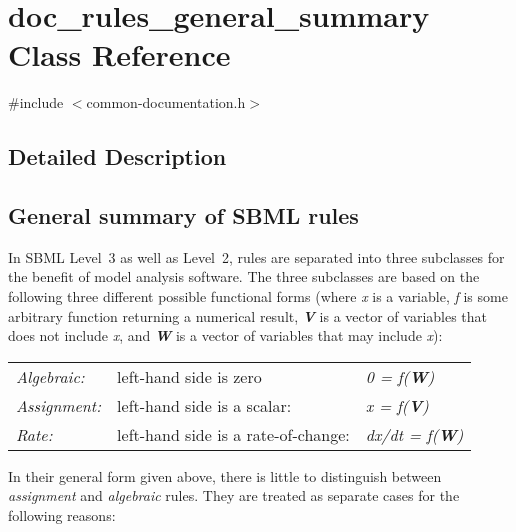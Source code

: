 \hypertarget{classdoc__rules__general__summary}{}\section{doc\+\_\+rules\+\_\+general\+\_\+summary Class Reference}
\label{classdoc__rules__general__summary}


{\ttfamily \#include $<$common-\/documentation.\+h$>$}



\subsection{Detailed Description}
\hypertarget{classdoc__rules__general__summary_rules-general}{}\subsection{General summary of S\+B\+M\+L rules}\label{classdoc__rules__general__summary_rules-general}
In S\+B\+ML Level~3 as well as Level~2, rules are separated into three subclasses for the benefit of model analysis software. The three subclasses are based on the following three different possible functional forms (where {\itshape x} is a variable, {\itshape f} is some arbitrary function returning a numerical result, {\bfseries {\itshape V}} is a vector of variables that does not include {\itshape x}, and {\bfseries {\itshape W}} is a vector of variables that may include {\itshape x})\+:

\tabulinesep=1mm
\begin{longtabu} spread 0pt [c]{*{3}{|X[-1]}|}
\hline
{\itshape Algebraic\+:}&left-\/hand side is zero&{\itshape 0 = f({\bfseries W})} \\
{\itshape Assignment\+:}&left-\/hand side is a scalar\+:&{\itshape x = f({\bfseries V})} \\
{\itshape Rate\+:}&left-\/hand side is a rate-\/of-\/change\+:&{\itshape dx/dt = f({\bfseries W})} \\
\end{longtabu}


In their general form given above, there is little to distinguish between {\itshape assignment} and {\itshape algebraic} rules. They are treated as separate cases for the following reasons\+:

